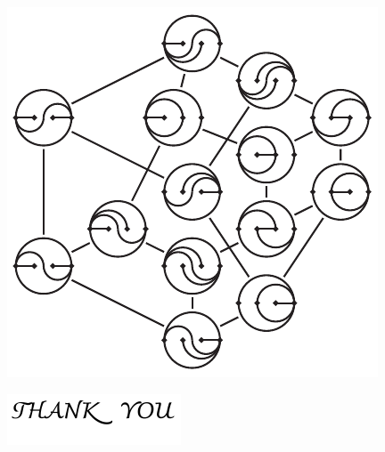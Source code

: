 \documentclass[12pt,titlepage,landscape,a4paper]{article}
\begin{document}
\vspace*{2cm}
\centerline{\includegraphics[scale=1.8]{wigglyFlipGraph}\quad{}}

\vspace*{.2cm}
\centerline{\includegraphics[scale=4]{wigglyThankYou}}
\end{document}
